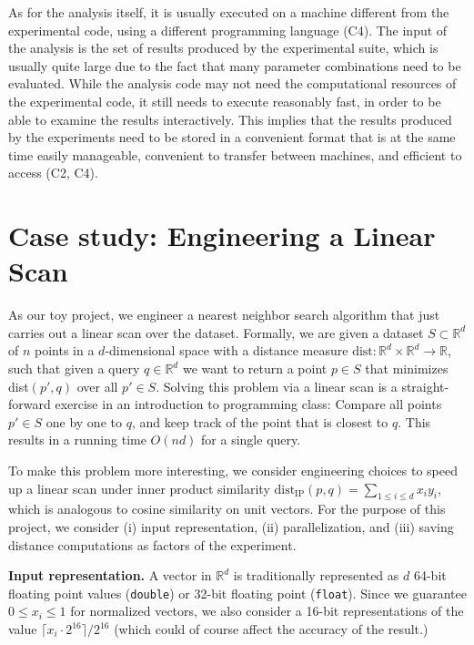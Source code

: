 \documentclass{llncs}
\newcommand{\myparagraph}[1]{\noindent \textbf{#1}}
\begin{document}
As for the analysis itself, it is usually executed on a machine different from the
experimental code, using a different programming language (C4).
The input of the analysis is the set of results produced by the experimental suite,
which is usually quite large due to the fact that many parameter combinations
need to be evaluated.
While the analysis code may not need the computational resources of the 
experimental code, it still needs to execute reasonably fast, in order to be able
to examine the results interactively.
This implies that the results produced by the experiments need to be 
stored in a convenient
format that is at the same time easily manageable, convenient to transfer between
machines, and efficient to access (C2, C4).



\section{Case study: Engineering a Linear Scan}

As our toy project, we engineer a nearest neighbor search algorithm that just carries out a linear scan over the dataset. 
Formally, we are given a dataset $S \subset \mathbb{R}^d$ of $n$ points in a $d$-dimensional space with a distance measure $\text{dist}\colon \mathbb{R}^d \times \mathbb{R}^d \rightarrow \mathbb{R}$, such that given a query $q \in \mathbb{R}^d$ we want to return a point $p \in S$ that minimizes dist$(p', q)$ over all $p' \in S$.
Solving this problem via a linear scan is a straight-forward exercise in an introduction to programming class: Compare all points $p' \in S$ one by one to $q$, and keep track of the point that is closest to $q$. This results in a running time $O(nd)$ for a single query.

To make this problem more interesting, we consider engineering choices to speed up a linear scan under inner product similarity $\text{dist}_{\text{IP}}(p,q) = \sum_{1 \leq i \leq d} x_i y_i$, which is analogous to cosine similarity on unit vectors. 
For the purpose of this project, we consider (i) input representation, (ii) parallelization, and (iii) saving distance computations as factors of the experiment.

\myparagraph{Input representation.}
A vector in $\mathbb{R}^d$ is traditionally represented as $d$ 64-bit floating point values (\texttt{double}) or 32-bit floating point (\texttt{float}). Since we guarantee $0 \leq x_i \leq 1$ for normalized vectors, we also consider a 16-bit representations of the value $\lceil x_i \cdot 2^{16} \rceil / 2^{16}$ (which could of course affect the accuracy of the result.)
\end{document}
